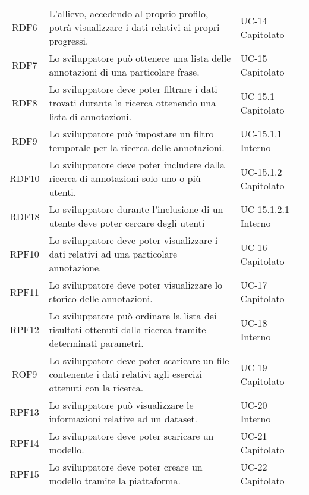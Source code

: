 \begin{tabularx}{\textwidth}{| c | p{10cm} | X |}
		RDF6 & L'allievo, accedendo al proprio profilo, potrà visualizzare i dati relativi ai propri progressi. & UC-14 \newline Capitolato\\
		RDF7 & Lo sviluppatore può ottenere una lista delle annotazioni di una particolare frase. & UC-15 \newline Capitolato\\
		RDF8 & Lo sviluppatore deve poter filtrare i dati trovati durante la ricerca ottenendo una lista di annotazioni. & UC-15.1 \newline Capitolato\\
		RDF9 & Lo sviluppatore può impostare un filtro temporale per la ricerca delle annotazioni. & UC-15.1.1 \newline Interno\\
		RDF10 & Lo sviluppatore deve poter includere dalla ricerca di annotazioni solo uno o più utenti. & UC-15.1.2 \newline Capitolato\\
		RDF18 & Lo sviluppatore durante l'inclusione di un utente deve poter cercare degli utenti & UC-15.1.2.1 \newline Interno\\		
		RPF10 & Lo sviluppatore deve poter visualizzare i dati relativi ad una particolare annotazione. & UC-16 \newline Capitolato\\
		RPF11 & Lo sviluppatore deve poter visualizzare lo storico delle annotazioni. & UC-17 \newline Capitolato\\
		RPF12 & Lo sviluppatore può ordinare la lista dei risultati ottenuti dalla ricerca tramite determinati parametri. & UC-18 \newline Interno\\	
		ROF9 & Lo sviluppatore deve poter scaricare un file contenente i dati relativi agli esercizi ottenuti con la ricerca. & UC-19 \newline Capitolato\\
		RPF13 & Lo sviluppatore può visualizzare le informazioni relative ad un dataset. & UC-20 \newline Interno\\
		RPF14 & Lo sviluppatore deve poter scaricare un modello. & UC-21 \newline Capitolato\\
		RPF15 & Lo sviluppatore deve poter creare un modello tramite la piattaforma. & UC-22 \newline Capitolato\\ 

\end{tabularx}
